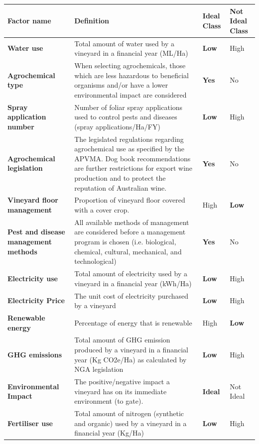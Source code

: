 \begin{table}[h]\label{tab:definitions} 
    \begin{tabular}{@{}llll@{}}
    \toprule
    \textbf{Factor name} & Definition & \textbf{Ideal Class} & Not Ideal Class \\ \midrule
    \textbf{Water use} & Total amount of water used by a vineyard in a financial year (ML/Ha) & \textbf{Low} & High \\
    \textbf{Agrochemical type} & When selecting agrochemicals, those which are less hazardous to beneficial organisms and/or have a lower environmental impact are considered & \textbf{Yes} & No \\
    \textbf{Spray application number} & Number of foliar spray applications used to control pests and diseases (spray applications/Ha/FY) & \textbf{Low} & High \\
    \textbf{Agrochemical legislation} & The legislated regulations regarding agrochemical use as specified by the APVMA. Dog book recommendations are further restrictions for export wine production and to protect the reputation of Australian wine. & \textbf{Yes} & No \\
    \textbf{Vineyard floor management} & Proportion of vineyard floor covered with a cover crop. & High & \textbf{Low} \\
    \textbf{Pest and disease management methods} & All available methods of management are considered before a management program is chosen (i.e. biological, chemical, cultural, mechanical, and technological) & \textbf{Yes} & No \\
    \textbf{Electricity use} & Total amount of electricity used by a vineyard in a financial year (kWh/Ha) & \textbf{Low} & High \\
    \textbf{Electricity Price} & The unit cost of electricity purchased by a vineyard & \textbf{Low} & High \\
    \textbf{Renewable energy} & Percentage of energy that is renewable & High & \textbf{Low} \\
    \textbf{GHG emissions} & Total amount of GHG emission produced by a vineyard in a financial year (Kg CO2e/Ha) as calculated  by NGA legislation & \textbf{Low} & High \\
    \textbf{Environmental Impact} & The positive/negative impact a vineyard has on its immediate environment (to gate). & \textbf{Ideal} & Not Ideal \\
    \textbf{Fertiliser use} & Total amount of nitrogen (synthetic and organic) used by a vineyard in a financial year (Kg/Ha) & \textbf{Low} & High \\

\end{tabular}
\end{table}
